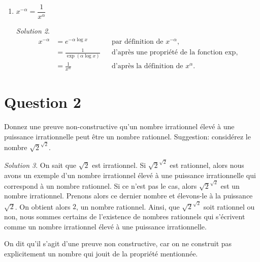 \documentclass[
  12pt,
  letterpaper,
]{book}
\theoremstyle{remark}
\newtheorem*{solution}{Solution}
\begin{document}
\begin{enumerate}
  \begin{solution}

  \begin{align}
  \left(\dfrac{x}{y}\right)^{\alpha} &=\exp\left(\alpha\log\dfrac{x}{y}\right) && \text{par définition de $\left(\dfrac{x}{y}\right)^{\alpha}$,} \\
  &=\exp\left(\alpha(\log x -\log y)\right) && \text{d'après une propriété de la fonction $\log$,} \\
  &=\exp\left(\alpha\log x -\alpha\log y\right), && \\
  &=\exp(\alpha\log x)\cdot\exp(-\alpha\log y) && \text{d'après une propriété de la fonction $\exp$,} \\
  &=\dfrac{x^{\alpha}}{y^{\alpha}} && \text{par définition de $x^{\alpha}$ et $y^{\alpha}$.}
  \end{align}

  \end{solution}
\item
  \(x^{-\alpha}=\dfrac{1}{x^{\alpha}}\)

  \begin{solution}

  \begin{align}
  x^{-\alpha} &=e^{-\alpha\log x} && \text{par définition de $x^{-\alpha}$,} \\
  &=\frac{1}{\exp(\alpha\log x)} && \text{d'après une propriété de la fonction $\exp$,} \\
  &=\frac{1}{x^{\alpha}} && \text{d'après la définition de $x^{\alpha}$.}
  \end{align}

  \end{solution}
\end{enumerate}

\hypertarget{question-2-1}{%
\section{Question 2}\label{question-2-1}}

Donnez une preuve non-constructive qu'un nombre irrationnel élevé à une
puissance irrationnelle peut être un nombre rationnel. Suggestion:
considérez le nombre \(\sqrt{2}^{\sqrt{2}}\).

\begin{solution}

On sait que \(\sqrt{2}\) est irrationnel. Si \(\sqrt{2}^{\sqrt{2}}\) est
rationnel, alors nous avons un exemple d'un nombre irrationnel élevé à
une puissance irrationnelle qui correspond à un nombre rationnel. Si ce
n'est pas le cas, alors \(\sqrt{2}^{\sqrt{2}}\) est un nombre
irrationnel. Prenons alors ce dernier nombre et élevons-le à la
puissance \(\sqrt{2}\). On obtient alors \(2\), un nombre rationnel.
Ainsi, que \(\sqrt{2}^{\sqrt{2}}\) soit rationnel ou non, nous sommes
certains de l'existence de nombres rationnels qui s'écrivent comme un
nombre irrationnel élevé à une puissance irrationnelle.

On dit qu'il s'agit d'une preuve non constructive, car on ne construit
pas explicitement un nombre qui jouit de la propriété mentionnée.

\end{solution}
\end{document}

